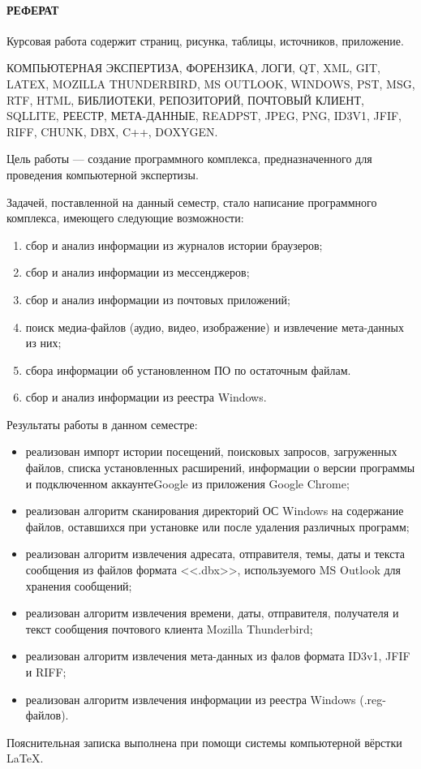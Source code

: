\newpage
{}
\paragraph{\hfill РЕФЕРАТ \hfill}
Курсовая работа содержит  страниц,  рисунка,  таблицы,  источников,  приложение.

КОМПЬЮТЕРНАЯ ЭКСПЕРТИЗА, ФОРЕНЗИКА, ЛОГИ, QT, XML, GIT, LATEX, MOZILLA THUNDERBIRD, MS OUTLOOK, WINDOWS, PST, MSG, RTF, HTML, БИБЛИОТЕКИ, РЕПОЗИТОРИЙ, ПОЧТОВЫЙ КЛИЕНТ, SQLLITE, РЕЕСТР, МЕТА-ДАННЫЕ, READPST, JPEG, PNG, ID3V1, JFIF, RIFF, CHUNK, DBX, C++, DOXYGEN.

Цель работы --- создание программного комплекса, предназначенного для проведения компьютерной экспертизы.

Задачей, поставленной на данный семестр, стало написание программного комплекса, имеющего следующие возможности: 
\begin{enumerate}
\item сбор и анализ информации из журналов истории браузеров;
\item сбор и анализ информации из мессенджеров;
\item сбор и анализ информации из почтовых приложений;
\item поиск медиа-файлов (аудио, видео, изображение) и извлечение мета-данных из них;
\item сбора информации об установленном ПО по остаточным файлам.
\item сбор и анализ информации из реестра Windows.
\end{enumerate}

Результаты работы в данном семестре:

\begin{itemize}
\item реализован импорт истории посещений, поисковых запросов, загруженных файлов, списка установленных расширений, информации о версии программы и подключенном аккаунтеGoogle из приложения Google Chrome;
\item реализован алгоритм сканирования директорий ОС Windows на содержание файлов, оставшихся при установке или после удаления различных программ;
\item реализован алгоритм извлечения адресата, отправителя, темы, даты и текста
сообщения из файлов формата <<.dbx>>, используемого MS Outlook для хранения сообщений;
\item реализован алгоритм извлечения времени, даты, отправителя, получателя и текст
сообщения почтового клиента Mozilla Thunderbird;
\item реализован алгоритм извлечения мета-данных из фалов формата ID3v1, JFIF и RIFF;
\item реализован алгоритм извлечения информации из реестра Windows (.reg-файлов).
\end{itemize}

Пояснительная записка выполнена при помощи системы компьютерной вёрстки \LaTeX.
